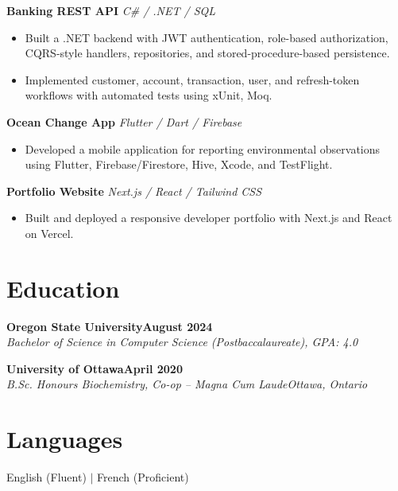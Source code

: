 \documentclass[10pt,letterpaper]{article}
\newcommand{\resumeEntry}[4]{
 \textbf{\color{heading}#1}\hfill \textbf{#2}\\[-1pt]
 \textit{#3}\hfill {\small\textit{#4}}\\[-3pt]
}
\begin{document}
\textbf{Banking REST API} \hfill \textit{C\# / .NET / SQL}
\begin{itemize}
 \item Built a .NET backend with JWT authentication, role-based authorization, CQRS-style handlers, repositories, and stored-procedure-based persistence.
 \item Implemented customer, account, transaction, user, and refresh-token workflows with automated tests using xUnit, Moq.
\end{itemize}

\textbf{Ocean Change App} \hfill \textit{Flutter / Dart / Firebase}
\begin{itemize}
 \item Developed a mobile application for reporting environmental observations using Flutter, Firebase/Firestore, Hive, Xcode, and TestFlight.
\end{itemize}

\textbf{Portfolio Website} \hfill \textit{Next.js / React / Tailwind CSS}
\begin{itemize}
 \item Built and deployed a responsive developer portfolio with Next.js and React on Vercel.
\end{itemize}

\section{Education}

\resumeEntry{Oregon State University}{August 2024}{Bachelor of Science in Computer Science (Postbaccalaureate), GPA: 4.0}{}
\vspace{2pt}
\resumeEntry{University of Ottawa}{April 2020}{B.Sc. Honours Biochemistry, Co-op -- Magna Cum Laude}{Ottawa, Ontario}

\section{Languages}
English (Fluent) \quad $\vert$ \quad French (Proficient)
\end{document}
